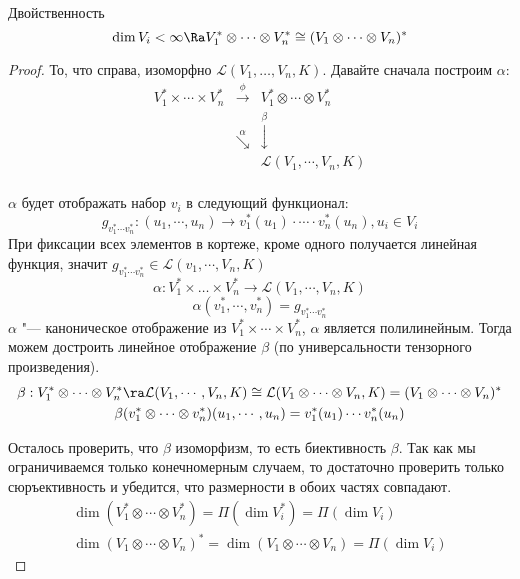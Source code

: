 \begin{theorem}{Двойственность}\hfill
$$\dim V_i < \infty \Ra V_1^* \otimes \cdots \otimes V_n^* \cong (V_1 \otimes \cdots \otimes V_n)^* $$ 
\end{theorem}
\begin{proof}
То, что справа, изоморфно $\mathcal L(V_1, \dots, V_n, K)$.
Давайте сначала построим $\alpha$:
$$
\begin{matrix}
V_1^* \times \cdots \times V_n^* & \overset{\phi}{\rightarrow}& V_1^* \otimes \cdots \otimes V_n^*\\
&\overset{\alpha}{\searrow}&\overset{\beta}{\downarrow}\\
&&\mathcal{L}(V_1, \cdots, V_n, K) \\
\end{matrix}
$$

$\alpha$ будет отображать набор $v_i$ в следующий функционал:
$$g_{v_1^* \cdots v_n^*} \colon (u_1, \cdots, u_n) \to v_1^*(u_1) \cdot \cdots \cdot v_n^*(u_n), u_i \in V_i$$
При фиксации всех элементов в кортеже, кроме одного получается линейная функция, 
значит $g_{v_1^* \cdots v_n^*} \in \mathcal{L}(v_1, \cdots, V_n, K)$\\
$$\alpha \colon V_1^* \times \dots \times V_n^* \to \mathcal{L}(V_1, \cdots, V_n, K) $$
$$\alpha(v_1^*, \cdots, v_n^*) = g_{v_1^* \cdots v_n^*} $$
$\alpha$ "--- каноническое отображение из $V_1^* \times \cdots \times V_n^*$, $\alpha$ является полилинейным.
Тогда можем достроить линейное отображение $\beta$ (по универсальности тензорного произведения).
\begin{gather*}
	\beta: V_1^* \otimes \cdots \otimes V_n^* \ra \mathcal{L}(V_1, \cdots, V_n, K) \cong \mathcal{L}(V_1 \otimes \cdots \otimes V_n, K) = (V_1 \otimes \cdots \otimes V_n)^* \\
	\beta(v^*_1 \otimes \cdots \otimes v^*_n)(u_1, \cdots, u_n) = v_1^*(u_1) \cdots v_n^*(u_n)
\end{gather*}
  
Осталось проверить, что $\beta$ изоморфизм, то есть биективность $\beta$.
Так как мы ограничиваемся только конечномерным случаем, то достаточно
проверить только сюръективность и убедится, что размерности в обоих частях 
совпадают. 
\begin{gather*}
        \dim (V_1^* \otimes \cdots \otimes V_n^*) = \Pi(\dim V_i^*) = \Pi (\dim V_i)\\
        \dim (V_1 \otimes \cdots \otimes V_n)^* = \dim (V_1 \otimes \cdots \otimes V_n) = \Pi (\dim V_i)
\end{gather*}


\end{proof}
